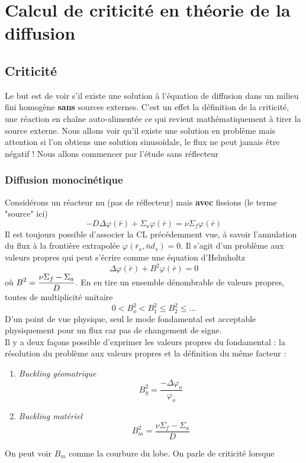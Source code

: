 \chapter{Calcul de criticité en théorie de la diffusion}
\section{Criticité}
Le but est de voir s'il existe une solution à l'équation de diffusion dans un milieu fini 
homogène \textbf{sans} sources externes. C'est un effet la définition de la criticité, une 
réaction en chaîne auto-alimentée ce qui revient mathématiquement à tirer la source externe. Nous 
allons voir qu'il existe une solution en problème mais attention si l'on obtiens une solution 
sinusoïdale, le flux ne peut jamais être négatif ! Nous allons commencer par l'étude sans réflecteur

\subsection{Diffusion monocinétique}
Considérons un réacteur nu (pas de réflecteur) mais \textbf{avec} fissions (le terme "source" ici)
\begin{equation}
 - D\Delta \varphi (\bar r) + {\Sigma _a}\varphi (\bar r) = \nu {\Sigma _f}\varphi (\bar r)
\end{equation}
Il est toujours possible d'associer la CL précédemment vue, à savoir l'annulation du flux à la 
frontière extrapolée $\varphi(\bar r_s, \bar nd_s)=0$. Il s'agit d'un problème aux valeurs propres qui
peut s'écrire comme une équation d'Helmholtz
\begin{equation}
\Delta \varphi (\bar r) + {B^2}\varphi (\bar r) = 0
\end{equation}
où $\displaystyle {B^2} = \frac{{\nu {\Sigma _f} - {\Sigma _a}}}{D}$. En en tire un ensemble dénombrable de 
valeurs propres, toutes de multiplicité unitaire
\begin{equation}
0 < B_o^2 < B_1^2 \le B_2^2 \leq \dots
\end{equation}
D'un point de vue physique, seul le mode fondamental est acceptable physiquement pour un flux car pas 
de changement de signe.\\

Il y a deux façons possible d'exprimer les valeurs propres du fondamental : la résolution du problème
aux valeurs propres et la définition du même facteur :
\begin{enumerate}
\item \textit{Buckling géomatrique}
\begin{equation}
B_g^2 = \frac{{ - \Delta {\varphi _o}}}{{{\varphi _o}}}
\end{equation}
\item \textit{Buckling matériel}
\begin{equation}
B_m^2 = \frac{{\nu {\Sigma _f} - {\Sigma _a}}}{D}
\end{equation}
\end{enumerate}
On peut voir $B_m$ comme la courbure du lobe.  On parle de criticité lorsque\\

